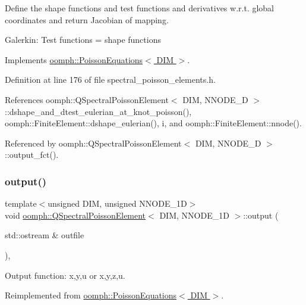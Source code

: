 Define the shape functions and test functions and derivatives w.\+r.\+t. global coordinates and return Jacobian of mapping.

Galerkin\+: Test functions = shape functions 

Implements \hyperlink{classoomph_1_1PoissonEquations_a88afb41d8733fb3488754cb579f44770}{oomph\+::\+Poisson\+Equations$<$ D\+I\+M $>$}.



Definition at line 176 of file spectral\+\_\+poisson\+\_\+elements.\+h.



References oomph\+::\+Q\+Spectral\+Poisson\+Element$<$ D\+I\+M, N\+N\+O\+D\+E\+\_\+D $>$\+::dshape\+\_\+and\+\_\+dtest\+\_\+eulerian\+\_\+at\+\_\+knot\+\_\+poisson(), oomph\+::\+Finite\+Element\+::dshape\+\_\+eulerian(), i, and oomph\+::\+Finite\+Element\+::nnode().



Referenced by oomph\+::\+Q\+Spectral\+Poisson\+Element$<$ D\+I\+M, N\+N\+O\+D\+E\+\_\+D $>$\+::output\+\_\+fct().

\mbox{\label{classoomph_1_1QSpectralPoissonElement_aa102e31f1f3c1f3040d69842aa0ad75a}} 
\subsubsection{\texorpdfstring{output()}{output()}\hspace{0.1cm}{\footnotesize\ttfamily [1/4]}}
{\footnotesize\ttfamily template$<$unsigned D\+IM, unsigned N\+N\+O\+D\+E\+\_\+1D$>$ \\
void \hyperlink{classoomph_1_1QSpectralPoissonElement}{oomph\+::\+Q\+Spectral\+Poisson\+Element}$<$ D\+IM, N\+N\+O\+D\+E\+\_\+1D $>$\+::output (\begin{DoxyParamCaption}\item[{std\+::ostream \&}]{outfile }\end{DoxyParamCaption})\hspace{0.3cm}{\ttfamily [inline]}, {\ttfamily [virtual]}}



Output function\+: x,y,u or x,y,z,u. 



Reimplemented from \hyperlink{classoomph_1_1PoissonEquations_a2417afb77d428846d7a1eada342ea8bb}{oomph\+::\+Poisson\+Equations$<$ D\+I\+M $>$}.



